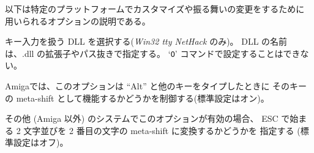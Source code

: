 以下は特定のプラットフォームでカスタマイズや振る舞いの変更をするために
用いられるオプションの説明である。

\blist{}
\item[\ib{altkeyhandler}]
キー入力を扱う DLL を選択する({\it Win32 tty\/ NetHack\/} のみ)。
DLL の名前は、.dll の拡張子やパス抜きで指定する。
`{\tt O}' コマンドで設定することはできない。
\item[\ib{altmeta}]
Amigaでは、このオプションは ``Alt'' と他のキーをタイプしたときに
そのキーの meta-shift として機能するかどうかを制御する(標準設定はオン)。
\item[\ib{altmeta}]
その他 (Amiga 以外) のシステムでこのオプションが有効の場合、
ESC で始まる 2 文字並びを 2 番目の文字の meta-shift に変換するかどうかを
指定する (標準設定はオフ)。

